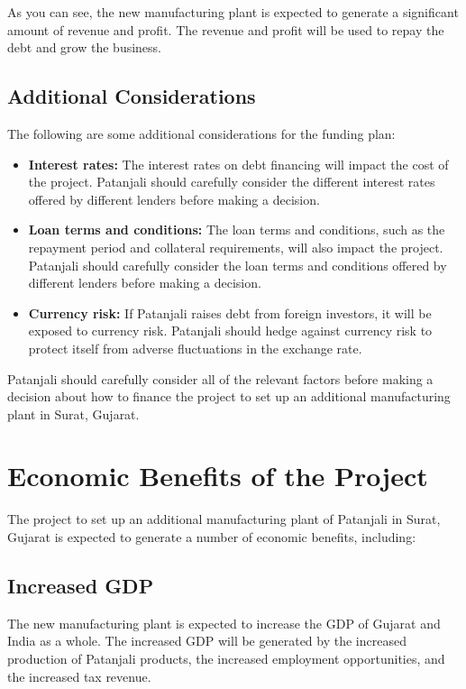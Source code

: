 As you can see, the new manufacturing plant is expected to generate a significant amount of revenue and profit. The revenue and profit will be used to repay the debt and grow the business.

\subsection{Additional Considerations}

The following are some additional considerations for the funding plan:

\begin{itemize}
    \item \textbf{Interest rates:} The interest rates on debt financing will impact the cost of the project. Patanjali should carefully consider the different interest rates offered by different lenders before making a decision.
    \item \textbf{Loan terms and conditions:} The loan terms and conditions, such as the repayment period and collateral requirements, will also impact the project. Patanjali should carefully consider the loan terms and conditions offered by different lenders before making a decision.
    \item \textbf{Currency risk:} If Patanjali raises debt from foreign investors, it will be exposed to currency risk. Patanjali should hedge against currency risk to protect itself from adverse fluctuations in the exchange rate.
\end{itemize}

Patanjali should carefully consider all of the relevant factors before making a decision about how to finance the project to set up an additional manufacturing plant in Surat, Gujarat.

\section{Economic Benefits of the Project}
The project to set up an additional manufacturing plant of Patanjali in Surat, Gujarat is expected to generate a number of economic benefits, including:

\subsection{Increased GDP}
The new manufacturing plant is expected to increase the GDP of Gujarat and India as a whole. The increased GDP will be generated by the increased production of Patanjali products, the increased employment opportunities, and the increased tax revenue.

